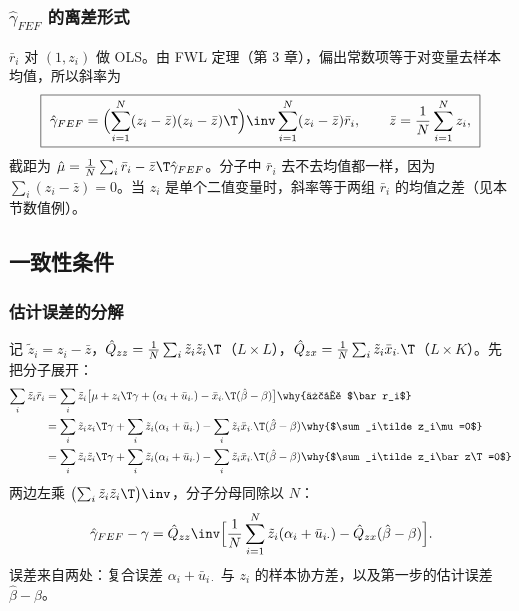 \subsubsection{\texorpdfstring{$\hat\gamma_{FEF}$}{gamma\_FEF} 的离差形式}

$\bar r_i$ 对 $(1,z_i)$ 做 OLS。由 FWL 定理（第 3 章），偏出常数项等于对变量去样本均值，所以斜率为
\begin{equation}\label{eq:U11b-gfef}
\boxed{\ \hat\gamma_{FEF}=\Bigl(\sum_{i=1}^N(z_i-\bar z)(z_i-\bar z)\T\Bigr)\inv\sum_{i=1}^N(z_i-\bar z)\bar r_i,\qquad \bar z=\frac1N\sum_{i=1}^Nz_i,\ }
\end{equation}
截距为 $\hat\mu=\frac1N\sum_i\bar r_i-\bar z\T\hat\gamma_{FEF}$。分子中 $\bar r_i$ 去不去均值都一样，因为 $\sum_i(z_i-\bar z)=0$。当 $z_i$ 是单个二值变量时，斜率等于两组 $\bar r_i$ 的均值之差（见本节数值例）。

\subsection{一致性条件}

\subsubsection{估计误差的分解}

记 $\tilde z_i=z_i-\bar z$，$\hat Q_{zz}=\frac1N\sum_i\tilde z_i\tilde z_i\T$（$L\times L$），$\hat Q_{zx}=\frac1N\sum_i\tilde z_i\bar x_{i\cdot}\T$（$L\times K$）。先把分子展开：
\begin{align*}
\sum_i\tilde z_i\bar r_i &= \sum_i\tilde z_i\bigl[\mu+z_i\T\gamma+(\alpha_i+\bar u_{i\cdot})-\bar x_{i\cdot}\T(\hat\beta-\beta)\bigr] \why{代入 $\bar r_i$}\\
&= \sum_i\tilde z_iz_i\T\gamma+\sum_i\tilde z_i(\alpha_i+\bar u_{i\cdot})-\sum_i\tilde z_i\bar x_{i\cdot}\T(\hat\beta-\beta) \why{$\sum_i\tilde z_i\mu=0$}\\
&= \sum_i\tilde z_i\tilde z_i\T\gamma+\sum_i\tilde z_i(\alpha_i+\bar u_{i\cdot})-\sum_i\tilde z_i\bar x_{i\cdot}\T(\hat\beta-\beta) \why{$\sum_i\tilde z_i\bar z\T=0$}
\end{align*}
两边左乘 $\bigl(\sum_i\tilde z_i\tilde z_i\T\bigr)\inv$，分子分母同除以 $N$：
\begin{equation}\label{eq:U11b-gerr}
\hat\gamma_{FEF}-\gamma=\hat Q_{zz}\inv\Bigl[\frac1N\sum_{i=1}^N\tilde z_i(\alpha_i+\bar u_{i\cdot})-\hat Q_{zx}(\hat\beta-\beta)\Bigr].
\end{equation}
误差来自两处：复合误差 $\alpha_i+\bar u_{i\cdot}$ 与 $z_i$ 的样本协方差，以及第一步的估计误差 $\hat\beta-\beta$。

